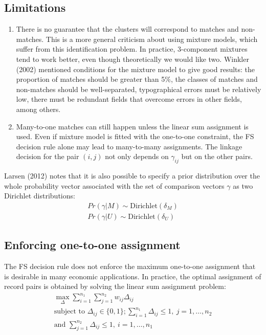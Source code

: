 \documentclass[11pt,reqno]{amsart}
\begin{document}
\subsection{Limitations}
\begin{enumerate}
\item There is no guarantee that the clusters will correspond to matches and non-matches.  This is a more general criticism about using mixture models, which suffer from this identification problem.  In practice, 3-component mixtures tend to work better, even though theoretically we would like two.  Winkler (2002) mentioned conditions for the mixture model to give good results: the proportion of matches should be greater than 5\%, the classes of matches and non-matches should be well-separated, typographical errors must be relatively low, there must be redundant fields that overcome errors in other fields, among others. 
\item Many-to-one matches can still happen unless the linear sum assignment is used.  Even if mixture model is fitted with the one-to-one constraint, the FS decision rule alone may lead to many-to-many assignments.  The linkage decision for the pair $(i,j)$ not only depends on $\gamma_{ij}$ but on the other pairs. 
\end{enumerate}


 Larsen (2012) notes that it is also possible to specify a prior distribution over the whole probability vector associated with the set of comparison vectors $\gamma$ as two Dirichlet distributions:
 \begin{gather*}
  Pr(\gamma | M) \sim \text{Dirichlet}(\delta_M) \\
 Pr(\gamma | U) \sim \text{Dirichlet}(\delta_U)
 \end{gather*}

\subsection{Enforcing one-to-one assignment}

The FS decision rule does not enforce the maximum one-to-one assignment that is desirable in many economic applications.  In practice, the optimal assignment of record pairs is obtained by solving the linear sum assignment problem: 
\begin{gather*}
\max_{\Delta} \sum_{i=1}^{n_1}\sum_{j=1}^{n_2} w_{ij} \Delta_{ij}\\
\text{subject to } \Delta_{ij} \in \{0,1\}; \sum_{i=1}^{n_1} \Delta_{ij} \leq 1, \ j=1, \dots, n_2 \\ \text{and } \sum_{j=1}^{n_2} \Delta_{ij} \leq 1, \ i=1, \dots, n_1 
\end{gather*} 
\end{document}
